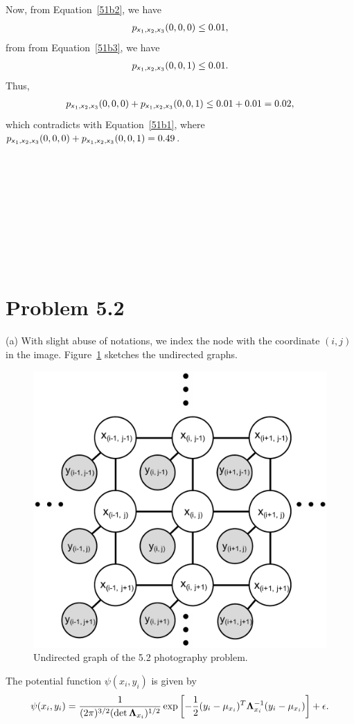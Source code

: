 \documentclass{article}
\newcommand{\s}[1]{\textsf{\textit{#1}}}
\newcommand{\qeds}{\hfill\qedsymbol}
\begin{document}
Now, from Equation~\eqref{51b2}, we have
\begin{align*}
	p_{\s{x}_1, \s{x}_2, \s{x}_3}(0, 0, 0) \leq 0.01,
\end{align*}
from from Equation~\eqref{51b3}, we have
\begin{align*}
	p_{\s{x}_1, \s{x}_2, \s{x}_3}(0, 0, 1) \leq 0.01.
\end{align*}
%
Thus, 
\begin{align*}
	p_{\s{x}_1, \s{x}_2, \s{x}_3}(0, 0, 0) + p_{\s{x}_1, \s{x}_2, \s{x}_3}(0, 0, 1) \leq 0.01 + 0.01 = 0.02,
\end{align*}
%
which contradicts with Equation~\eqref{51b1}, where 
$p_{\s{x}_1, \s{x}_2, \s{x}_3}(0, 0, 0) + p_{\s{x}_1, \s{x}_2, \s{x}_3}(0, 0, 1) = 0.49$.
\qeds
\\
\\
\\
\\
\\
\\
\\
\\
\\
\\

\pagebreak
%
\section*{Problem 5.2}
(a) With slight abuse of notations, we index the node with the coordinate
$(i, j)$ in the image. Figure~\ref{f:52a} sketches the undirected graphs.
%
\begin{figure}[h]
  \centering
  \includegraphics[width=0.4\columnwidth]{52a.pdf}
    \vspace{-0.1cm}
  \caption{Undirected graph of the 5.2 photography problem.}
  \label{f:52a}
\end{figure}
%

The potential function $\psi(x_i, y_i)$ is given by
\begin{align*}
	\psi(x_i, y_i) = \frac{1}{(2\pi)^{3/2}(\det {\bf\Lambda}_{x_i})^{1/2}}
	\exp\left[-\frac{1}{2}(y_i-\mu_{x_i})^T\mathbf{\Lambda}^{-1}_{x_i}(y_i - \mu_{x_i})\right] + \epsilon.
\end{align*}
\\
\end{document}
